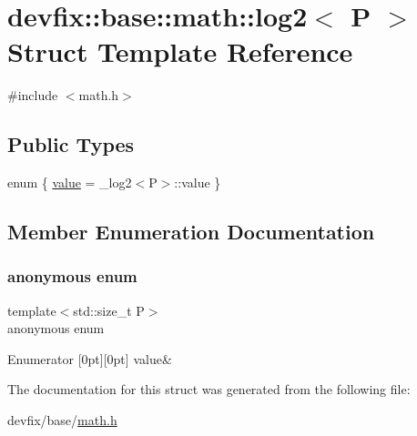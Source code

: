 \hypertarget{structdevfix_1_1base_1_1math_1_1log2}{}\section{devfix\+:\+:base\+:\+:math\+:\+:log2$<$ P $>$ Struct Template Reference}
\label{structdevfix_1_1base_1_1math_1_1log2}


{\ttfamily \#include $<$math.\+h$>$}

\subsection*{Public Types}
\begin{DoxyCompactItemize}
\item 
enum \{ \hyperlink{structdevfix_1_1base_1_1math_1_1log2_a75770853baf4a4a18b541c864758cbf1a9b6690702e3b34c679c9031b27d81f36}{value} = \+\_\+log2$<$P$>$\+:\+:value
 \}
\end{DoxyCompactItemize}


\subsection{Member Enumeration Documentation}
\mbox{\label{structdevfix_1_1base_1_1math_1_1log2_a75770853baf4a4a18b541c864758cbf1}} 
\subsubsection{\texorpdfstring{anonymous enum}{anonymous enum}}
{\footnotesize\ttfamily template$<$std\+::size\+\_\+t P$>$ \\
anonymous enum}

\begin{DoxyEnumFields}{Enumerator}
[0pt][0pt]{}\mbox{\label{structdevfix_1_1base_1_1math_1_1log2_a75770853baf4a4a18b541c864758cbf1a9b6690702e3b34c679c9031b27d81f36}} 
value&\\
\hline

\end{DoxyEnumFields}


The documentation for this struct was generated from the following file\+:\begin{DoxyCompactItemize}
\item 
devfix/base/\hyperlink{math_8h}{math.\+h}\end{DoxyCompactItemize}
